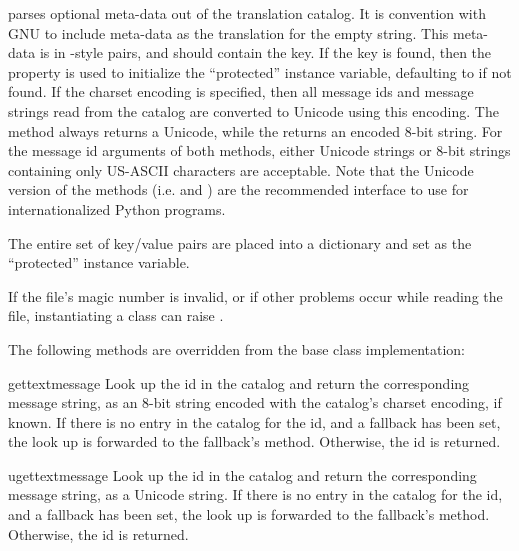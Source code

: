  parses optional meta-data out of the
translation catalog.  It is convention with GNU  to
include meta-data as the translation for the empty string.  This
meta-data is in -style  pairs, and should
contain the  key.  If the key
 is found, then the  property is used
to initialize the ``protected''  instance variable,
defaulting to  if not found.  If the charset encoding is
specified, then all message ids and message strings read from the
catalog are converted to Unicode using this encoding.  The
 method always returns a Unicode, while the
 returns an encoded 8-bit string.  For the message
id arguments of both methods, either Unicode strings or 8-bit strings
containing only US-ASCII characters are acceptable.  Note that the
Unicode version of the methods (i.e.  and
) are the recommended interface to use for
internationalized Python programs.

The entire set of key/value pairs are placed into a dictionary and set
as the ``protected''  instance variable.

If the  file's magic number is invalid, or if other problems
occur while reading the file, instantiating a  class
can raise .

The following methods are overridden from the base class implementation:

\begin{methoddesc}[GNUTranslations]{gettext}{message}
Look up the  id in the catalog and return the
corresponding message string, as an 8-bit string encoded with the
catalog's charset encoding, if known.  If there is no entry in the
catalog for the  id, and a fallback has been set, the
look up is forwarded to the fallback's  method.
Otherwise, the  id is returned.
\end{methoddesc}

\begin{methoddesc}[GNUTranslations]{ugettext}{message}
Look up the  id in the catalog and return the
corresponding message string, as a Unicode string.  If there is no
entry in the catalog for the  id, and a fallback has been
set, the look up is forwarded to the fallback's 
method.  Otherwise, the  id is returned.
\end{methoddesc}

